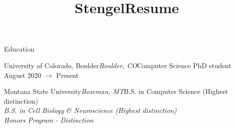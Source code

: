 \documentclass{resume} %
\title{StengelResume}
\begin{document}
\vspace{-.3cm}
\begin{rSection}{Education}
\begin{rSubsection}{University of Colorado, Boulder}{\textit{Boulder, CO}}{Computer Science PhD student} \hfill {} \newline \hspace*{\fill} August 2020 $\to$ Present %
\vspace{-.65cm}
\item[]
\end{rSubsection}
\vspace{0.6cm}

\begin{rSubsection}{Montana State University}{\textit{Bozeman, MT}}{B.S. in Computer Science (Highest distinction)\hfill {} \textit{ \\  B.S. in Cell Biology \& Neuroscience  (Highest distinction)\hfill {}\\ \textit{Honors Program - Distinction}} }{}
\vspace{-.65cm}
\item[]
\end{rSubsection}
\vspace{-.6cm}
\end{rSection}

\end{document}
